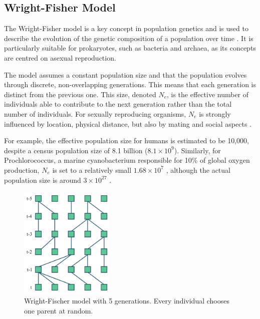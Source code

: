 \subsection{Wright-Fisher Model}
The Wright-Fisher model is a key concept in population genetics and is used to describe the evolution of the genetic composition of a population over time \cite{WF_Model_Messer_2016}.
It is particularly suitable for prokaryotes, such as bacteria and archaea, as its concepts are centred on asexual reproduction.

The model assumes a constant population size and that the population evolves through discrete, non-overlapping generations.
This means that each generation is distinct from the previous one.
This size, denoted $N_e$, is the effective number of individuals able to contribute to the next generation rather than the total number of individuals.
For sexually reproducing organisms, $N_e$ is strongly influenced by location, physical distance, but also by mating and social aspects \cite{Human_Popgen_Lohmueller_2021}.

For example, the effective population size for humans is estimated to be 10,000, despite a census population size of 8.1 billion ($8.1 \times 10^9$).
Similarly, for Prochlorococcus, a marine cyanobacterium responsible for 10\% of global oxygen production, $N_e$ is set to a relatively small $1.68 \times 10^7$ \cite{Prochlorococcus_Chen_2021},
although the actual population size is around $3 \times 10^{27}$ \cite{Prochlorococcus_Flombaum_2013}.

\begin{figure}[h]
      \centering
      \includegraphics[width=0.4\textwidth]{figures/wf.pdf}
      \caption[Wright-Fischer model.]{Wright-Fischer model with 5 generations. Every individual chooses one parent at random.}
      \label{fig:wright-fisher}
\end{figure}

